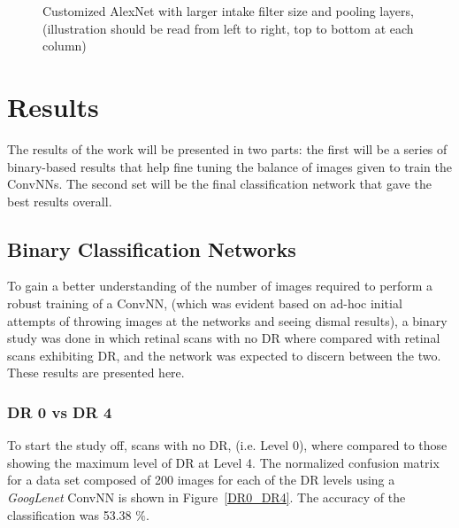 \documentclass[letterpaper,12pt]{article}
\newcommand{\figref}[1]{Figure~\ref{#1}}
\begin{document}
\begin{figure}[htbp]
\begin{center}
\caption{Customized AlexNet with larger intake filter size and pooling layers, (illustration should be read from left to right, top to bottom at each column)}
\label{alexnet}
\end{center}
\end{figure}

\section{Results}

The results of the work will be presented in two parts: the first will be a series of binary-based results that help fine tuning the balance of images given to train the ConvNNs. The second set will be the final classification network that gave the best results overall. 

\subsection{Binary Classification Networks}

To gain a better understanding of the number of images required to perform a robust training of a ConvNN, (which was evident based on ad-hoc initial attempts of throwing images at the networks and seeing dismal results), a binary study was done in which retinal scans with no DR where compared with retinal scans exhibiting DR, and the network was expected to discern between the two. These results are presented here.

\subsubsection{DR 0 vs DR 4}

To start the study off, scans with no DR, (i.e. Level 0), where compared to those showing the maximum level of DR at Level 4. The normalized confusion matrix for a data set composed of 200 images for each of the DR levels using a \textit{GoogLenet} ConvNN is shown in \figref{DR0_DR4}. The accuracy of the classification was 53.38 $\%$.
\end{document}
